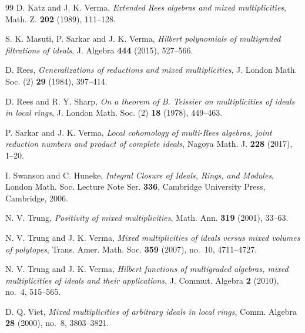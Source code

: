 \documentclass[reqno,12pt]{amsart}
\theoremstyle{plain}
\theoremstyle{definition}
\theoremstyle{remark}
\numberwithin{equation}{section}
\begin{document}
\begin{thebibliography}{99}
D. Katz and J. K. Verma,
\emph{Extended Rees algebras and mixed multiplicities},
Math. Z. \textbf{202} (1989), 111--128.

S. K. Masuti, P. Sarkar and J. K. Verma,
\emph{Hilbert polynomials of multigraded filtrations of ideals},
J. Algebra \textbf{444} (2015), 527--566.

D. Rees,
\emph{Generalizations of reductions and mixed multiplicities},
J. London Math. Soc. (2) \textbf{29} (1984), 397--414.

D. Rees and R. Y. Sharp,
\emph{On a theorem of B. Teissier on multiplicities of ideals in local
rings},
J. London Math. Soc. (2) \textbf{18} (1978), 449--463.


P. Sarkar and J. K. Verma,
\emph{Local cohomology of multi-Rees algebras, joint reduction numbers and product of complete ideals},
Nagoya Math. J. \textbf{228} (2017), 1--20.

I. Swanson and C. Huneke,
\emph{Integral Closure of Ideals, Rings, and Modules},
London Math. Soc. Lecture Note Ser. \textbf{336},
Cambridge University Press, Cambridge, 2006.

N. V. Trung,
\emph{Positivity of mixed multiplicities},
Math. Ann. \textbf{319} (2001), 33--63.

N. V. Trung and J. K. Verma,
\emph{Mixed multiplicities of ideals versus mixed volumes of polytopes},
Trans. Amer. Math. Soc. \textbf{359} (2007), no.~10, 4711--4727.

N. V. Trung and J. K. Verma,
\emph{Hilbert functions of multigraded algebras, mixed multiplicities
of ideals and their applications},
J. Commut. Algebra \textbf{2} (2010), no.~4, 515--565.

D. Q. Viet,
\emph{Mixed multiplicities of arbitrary ideals in local rings},
Comm. Algebra \textbf{28} (2000), no.~8, 3803--3821.

\end{thebibliography}
\end{document}
